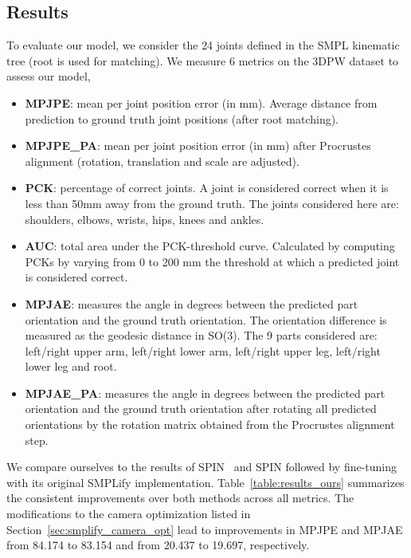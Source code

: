\documentclass[runningheads]{llncs}
\begin{document}
\subsection{Results}

To evaluate our model, we consider the 24 joints defined in the SMPL kinematic tree (root is used for matching).
We measure 6 metrics on the 3DPW dataset to assess our model,

\begin{itemize}
	\item \textbf{MPJPE}: mean per joint position error (in mm). Average distance from prediction to ground truth joint positions (after root matching).
	\item \textbf{MPJPE\_PA}: mean per joint position error (in mm) after Procrustes alignment (rotation, translation and scale are adjusted).
	\item \textbf{PCK}: percentage of correct joints. A joint is considered correct when it is less than 50mm away from the ground truth. The joints considered here are: shoulders, elbows, wrists, hips, knees and ankles.
	\item \textbf{AUC}: total area under the PCK-threshold curve. Calculated by computing PCKs by varying from 0 to 200 mm the threshold at which a predicted joint is considered correct.
	\item \textbf{MPJAE}: measures the angle in degrees between the predicted part orientation and the ground truth orientation. The orientation difference is measured as the geodesic distance in SO(3). The 9 parts considered are: left/right upper arm, left/right lower arm, left/right upper leg, left/right lower leg and root.
	\item \textbf{MPJAE\_PA}: measures the angle in degrees between the predicted part orientation and the ground truth orientation after rotating all predicted orientations by the rotation matrix obtained from the Procrustes alignment step. 
\end{itemize}

We compare ourselves to the results of SPIN~\cite{kolotouros2019learning} and SPIN followed by fine-tuning with its original SMPLify implementation. Table~\ref{table:results_ours} summarizes the consistent improvements over both methods across all metrics. The modifications to the camera optimization listed in Section~\ref{sec:smplify_camera_opt} lead to improvements in MPJPE and MPJAE from 84.174 to 83.154 and from 20.437 to 19.697, respectively. 
\end{document}
